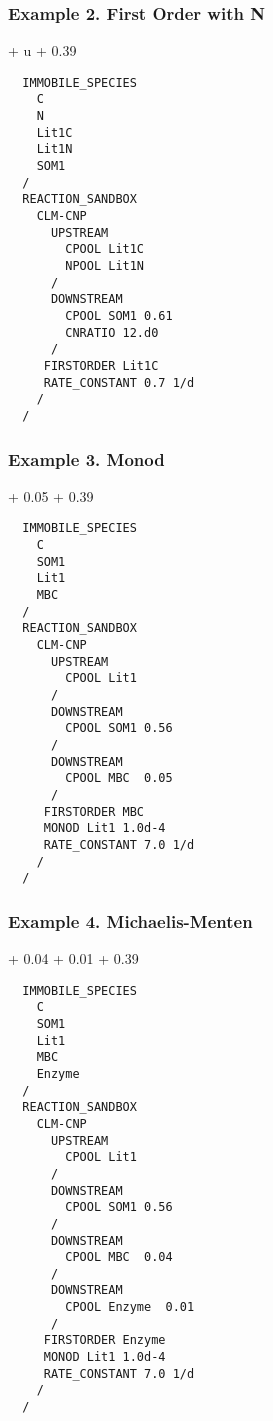\documentclass{beamer}
\def\EQ#1\EN{\begin{equation*}#1\end{equation*}}
\begin{document}
\begin{frame}[fragile]
\frametitle{Example 2. First Order with N}
\EQ
\text{Lit1C} + u\:  \:  + 0.39 \: 
\EN
\tiny
\begin{verbatim}
  IMMOBILE_SPECIES
    C
    N
    Lit1C
    Lit1N
    SOM1
  /
  REACTION_SANDBOX
    CLM-CNP
      UPSTREAM
        CPOOL Lit1C
        NPOOL Lit1N
      /
      DOWNSTREAM
        CPOOL SOM1 0.61
        CNRATIO 12.d0
      /
     FIRSTORDER Lit1C
     RATE_CONSTANT 0.7 1/d 
    /
  /
\end{verbatim}  
\end{frame}

\begin{frame}[fragile]
\frametitle{Example 3. Monod}
\EQ
\text{Lit1} \:  + 0.05 \:  + 0.39 \: 
\EN

\tiny
\begin{verbatim}
  IMMOBILE_SPECIES
    C
    SOM1
    Lit1
    MBC
  /
  REACTION_SANDBOX
    CLM-CNP
      UPSTREAM
        CPOOL Lit1
      /
      DOWNSTREAM
        CPOOL SOM1 0.56
      /
      DOWNSTREAM
        CPOOL MBC  0.05
      /
     FIRSTORDER MBC
     MONOD Lit1 1.0d-4
     RATE_CONSTANT 7.0 1/d 
    /
  /
\end{verbatim}  
\end{frame}
\begin{frame}[fragile]
\frametitle{Example 4. Michaelis-Menten}
\EQ
\text{Lit1} \:  + 0.04 \:  + 0.01 \:  + 0.39 \: 
\EN

\tiny
\begin{verbatim}
  IMMOBILE_SPECIES
    C
    SOM1
    Lit1
    MBC
    Enzyme
  /
  REACTION_SANDBOX
    CLM-CNP
      UPSTREAM
        CPOOL Lit1
      /
      DOWNSTREAM
        CPOOL SOM1 0.56
      /
      DOWNSTREAM
        CPOOL MBC  0.04
      /
      DOWNSTREAM
        CPOOL Enzyme  0.01
      /
     FIRSTORDER Enzyme
     MONOD Lit1 1.0d-4
     RATE_CONSTANT 7.0 1/d 
    /
  /
\end{verbatim}  
\end{frame}
\end{document}
